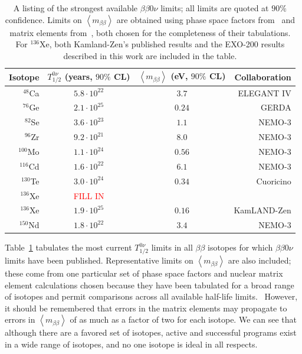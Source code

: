 \begin{table}
\begin{center}
\begin{tabular}{|rccr|}
\hline Isotope & $T_{1/2}^{0\nu}$ (years, $90\%$ CL) & $\left<m_{\beta\beta}\right>$ (eV, $90\%$ CL) & Collaboration \\ \hline
$^{48}$Ca & $5.8 \cdot 10^{22}$ & $3.7$ & ELEGANT IV \cite{ElegantIV}\\
$^{76}$Ge & $2.1 \cdot 10^{25}$ & $0.24$ & GERDA \cite{PhysRevLett.111.122503} \\
$^{82}$Se & $3.6 \cdot 10^{23}$ & $1.1$ & NEMO-3 \cite{NEMO2011RandomOtherIsotopes}\\
$^{96}$Zr & $9.2 \cdot 10^{21}$ & $8.0$ & NEMO-3 \cite{Argyriades2010168}\\
$^{100}$Mo & $1.1 \cdot 10^{24}$ & $0.56$ & NEMO-3 \cite{NEMO3-2013-100Mo}\\
$^{116}$Cd & $1.6 \cdot 10^{22}$ & $6.1$ & NEMO-3 \cite{NEMO2011RandomOtherIsotopes}\\
$^{130}$Te & $3.0 \cdot 10^{24}$ & $0.34$ & Cuoricino \cite{PhysRevC.78.035502}\\
$^{136}$Xe & \textcolor{red}{FILL IN} & & \\
$^{136}$Xe & $1.9 \cdot 10^{25}$ & $0.16$ & KamLAND-Zen \cite{PhysRevLett.110.062502}\\
$^{150}$Nd & $1.8 \cdot 10^{22}$ & $3.4$ & NEMO-3 \cite{PhysRevC.80.032501}\\
\hline
\end{tabular}
\end{center}
\caption{A listing of the strongest available $\beta\beta 0\nu$ limits; all limits are quoted at $90\%$ confidence.  Limits on $\left<m_{\beta\beta}\right>$ are obtained using phase space factors from~\cite{PhysRevC.85.034316} and matrix elements from~\cite{PhysRevLett.109.042501}, both chosen for the completeness of their tabulations.  For $^{136}$Xe, both Kamland-Zen's published results and the EXO-200 results described in this work are included in the table.}
\label{tab:0nubb_limits}
\end{table}

Table~\ref{tab:0nubb_limits} tabulates the most current $T_{1/2}^{0\nu}$ limits in all $\beta\beta$ isotopes for which $\beta\beta 0\nu$ limits have been published.  Representative limits on $\left< m_{\beta\beta}\right>$ are also included; these come from one particular set of phase space factors and nuclear matrix element calculations chosen because they have been tabulated for a broad range of isotopes and permit comparisons across all available half-life limits.~\cite{PhysRevC.85.034316,PhysRevLett.109.042501}  However, it should be remembered that errors in the matrix elements may propagate to errors in $\left< m_{\beta\beta}\right>$ of as much as a factor of two for each isotope.  We can see that although there are a favored set of isotopes, active and successful programs exist in a wide range of isotopes, and no one isotope is ideal in all respects.

